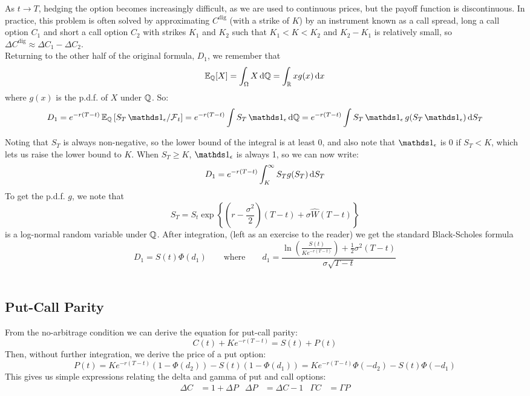 \documentclass[11pt]{article}
\begin{document}
As $t \rightarrow T$, hedging the option becomes increasingly difficult, as we are used to continuous prices, but the payoff function is discontinuous. In practice, this problem is often solved by approximating $C^{\text{dig}}$ (with a strike of $K$) by an instrument known as a call spread, long a call option $C_1$ and short a call option $C_2$ with strikes $K_1$ and $K_2$ such that $K_1 < K < K_2$ and $K_2 - K_1$ is relatively small, so $\Delta C^{\text{dig}} \approx \Delta C_1 - \Delta C_2$.\\

Returning to the other half of the original formula, $D_1$, we remember that 
$$\Exp_{\Qmeas}[X] = \int_{\Omega} X \dif \Qmeas = \int_{\Real} x g(x) \dif x$$
where $g(x)$ is the p.d.f. of $X$ under $\operatorname{\mathbb Q}$. So:
$$D_1 = e^{-r(T-t)}\Exp_{\Qmeas}\left[ S_T \Ind_{\epsilon} \middle/ \Filtr_t \right] = e^{-r(T-t)}\int S_T \Ind_{\epsilon} \dif \Qmeas = e^{-r(T-t)}\int S_T \Ind_{\epsilon} g(S_T \Ind_{\epsilon}) \dif S_T$$

Noting that $S_T$ is always non-negative, so the lower bound of the integral is at least 0, and also note that $\Ind_{\epsilon}$ is 0 if $S_T < K$, which lets us raise the lower bound to $K$. When $S_T \geq K$, $\Ind_{\epsilon}$ is always 1, so we can now write:
$$D_1 = e^{-r(T-t)}\int_K^\infty S_T g(S_T) \dif S_T$$
To get the p.d.f. $g$, we note that 
$$S_T = S_t \exp \left\{ \left( r - \frac{\sigma^2}{2}\right)(T-t) + \sigma \hat{W}(T-t)\right\} $$
is a log-normal random variable under $\operatorname{\mathbb Q}$. After integration, (left as an exercise to the reader) we get the standard Black-Scholes formula 
$$D_1=S(t)\Phi(d_1) \qquad \text{where} \qquad d_1 = \frac{\ln \left( \frac{S(t)}{Ke^{-r(T-t)}}\right) + \frac{1}{2}\sigma^2(T-t)}{\sigma \sqrt{T-t}}$$\\

\subsection{Put-Call Parity}
From the no-arbitrage condition we can derive the equation for put-call parity:
$$C(t) + Ke^{-r(T-t)} = S(t) + P(t)$$
Then, without further integration, we derive the price of a put option:
$$P(t) = Ke^{-r(T-t)}\left( 1 - \Phi(d_2) \right) - S(t) \left( 1 - \Phi(d_1)\right) = Ke^{-r(T-t)}\Phi(-d_2) - S(t) \Phi(-d_1)$$
This gives us simple expressions relating the delta and gamma of put and call options:
\begin{align*}
\Delta C &= 1 + \Delta P & \Delta P &= \Delta C - 1 & \Gamma C &= \Gamma P
\end{align*}
\end{document}

